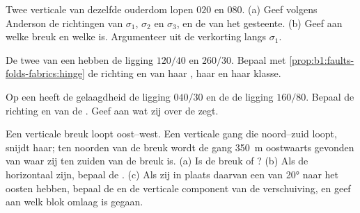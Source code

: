 \begin{exercise}[$\star\star$]\label{exo:b1:faults-folds-fabrics:6}
Twee verticale  van dezelfde ouderdom lopen $020$ en $080$. (a) Geef volgens Anderson de richtingen van $\sigma_1$, $\sigma_2$ en $\sigma_3$, en de  van het gesteente. (b) Geef aan welke breuk  en welke  is. Argumenteer uit de verkorting langs $\sigma_1$.
\end{exercise}

\begin{exercise}[$\star\star$]\label{exo:b1:faults-folds-fabrics:7}
De twee  van een  hebben de ligging $120/40$ en $260/30$. Bepaal met \cref{prop:b1:faults-folds-fabrics:hinge} de richting en  van haar , haar  en haar klasse.
\end{exercise}

\begin{exercise}[$\star\star$]\label{exo:b1:faults-folds-fabrics:8}
Op een  heeft de gelaagdheid de ligging $040/30$ en de  de ligging $160/80$. Bepaal de richting en  van de . Geef aan wat zij over de  zegt.
\end{exercise}

\begin{exercise}[$\star\star$]\label{exo:b1:faults-folds-fabrics:9}
Een verticale breuk loopt oost--west. Een verticale gang die noord--zuid loopt, snijdt haar; ten noorden van de breuk wordt de gang \qty{350}{m} oostwaarts gevonden van waar zij ten zuiden van de breuk is. (a) Is de breuk  of ? (b) Als de  horizontaal zijn, bepaal de . (c) Als zij in plaats daarvan een  van \ang{20} naar het oosten hebben, bepaal de  en de verticale component van de verschuiving, en geef aan welk blok omlaag is gegaan.
\end{exercise}

